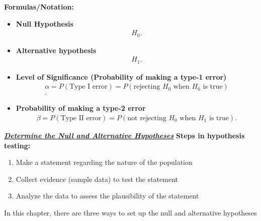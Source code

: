 \documentclass{report}
\begin{document}
    \bigbreak \noindent 
    \textbf{Formulas/Notation:}
    \begin{itemize}
        \item \textbf{Null Hypothesis} 
            \begin{align*}
                H_{0}
            .\end{align*}
        \item \textbf{Alternative hypothesis} 
            \begin{align*}
                H_{1}
            .\end{align*}
        \item \textbf{Level of Significance (Probability of making a type-1 error)} 
            \begin{align*}
                \alpha = P(\text{Type I error}) = P(\text{rejecting } H_0 \text{ when } H_0 \text{ is true}) \\
            .\end{align*}
        \item \textbf{Probability of making a type-2 error}
            \begin{align*}
                \beta = P(\text{Type II error}) = P(\text{not rejecting } H_0 \text{ when } H_1 \text{ is true})
            .\end{align*}
    \end{itemize}
    \pagebreak \bigbreak \noindent 
    \textbf{\textit{\underline{Determine the Null and Alternative Hypotheses}}}
    \bigbreak \noindent 
    \textbf{Steps in hypothesis testing:}
    \begin{enumerate}
        \item Make a statement regarding the nature of the population
        \item Collect evidence (sample data) to test the statement
        \item Analyze the data to assess the plausibility of the statement
    \end{enumerate}
    \bigbreak \noindent 
    In this chapter, there are three ways to set up the null and alternative hypotheses
\end{document}
